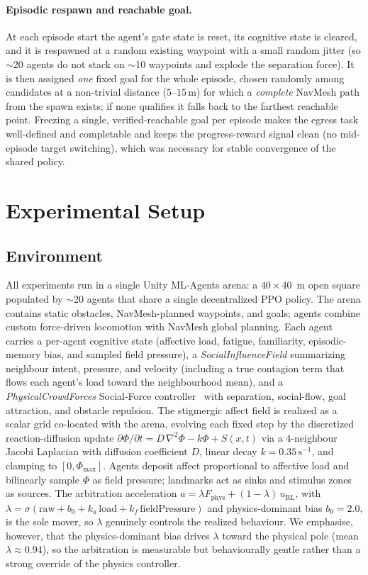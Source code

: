 \documentclass[sigconf,nonacm]{acmart}
\begin{document}
\paragraph{Episodic respawn and reachable goal.} At each episode start the agent's gate state is reset, its cognitive state is cleared, and it is respawned at a random existing waypoint with a small random jitter (so $\sim$20 agents do not stack on $\sim$10 waypoints and explode the separation force). It is then assigned \emph{one} fixed goal for the whole episode, chosen randomly among candidates at a non-trivial distance ($5$--$15$\,m) for which a \emph{complete} NavMesh path from the spawn exists; if none qualifies it falls back to the farthest reachable point. Freezing a single, verified-reachable goal per episode makes the egress task well-defined and completable and keeps the progress-reward signal clean (no mid-episode target switching), which was necessary for stable convergence of the shared policy.

\section{Experimental Setup}
\subsection{Environment}
All experiments run in a single Unity ML-Agents arena: a $40\times40$~m open
square populated by $\sim$20 agents that share a single decentralized PPO
policy. The arena contains static obstacles, NavMesh-planned waypoints, and
goals; agents combine custom force-driven locomotion with NavMesh global
planning. Each agent carries a per-agent cognitive state (affective load,
fatigue, familiarity, episodic-memory bias, and sampled field pressure), a
\emph{SocialInfluenceField} summarizing neighbour intent, pressure, and
velocity (including a true contagion term that flows each agent's load toward
the neighbourhood mean), and a \emph{PhysicalCrowdForces} Social-Force
controller~\cite{helbing1995} with separation, social-flow, goal attraction,
and obstacle repulsion. The stigmergic affect field is realized as a scalar
grid co-located with the arena, evolving each fixed step by the discretized
reaction-diffusion update $\partial\Phi/\partial t = D\,\nabla^2\Phi - k\Phi +
S(x,t)$ via a $4$-neighbour Jacobi Laplacian with diffusion coefficient $D$,
linear decay $k=0.35\,\mathrm{s}^{-1}$, and clamping to $[0,\Phi_{\max}]$.
Agents deposit affect proportional to affective load and bilinearly sample
$\Phi$ as field pressure; landmarks act as sinks and stimulus zones as sources.
The arbitration acceleration
$a = \lambda F_{\mathrm{phys}} + (1-\lambda)\,u_{\mathrm{RL}}$, with
$\lambda=\sigma(\text{raw}+b_0+k_a\,\mathrm{load}+k_f\,\mathrm{fieldPressure})$
and physics-dominant bias $b_0=2.0$, is the sole mover, so $\lambda$ genuinely
controls the realized behaviour. We emphasise, however, that the physics-dominant
bias drives $\lambda$ toward the physical pole (mean $\lambda\approx0.94$),
so the arbitration is measurable but behaviourally gentle rather than a strong
override of the physics controller.
\end{document}
